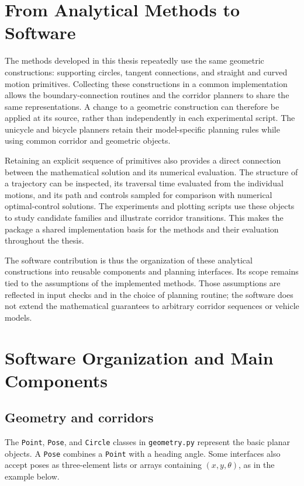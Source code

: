 \section{From Analytical Methods to Software}

The methods developed in this thesis repeatedly use the same geometric
constructions: supporting circles, tangent connections, and straight and curved
motion primitives. Collecting these constructions in a common implementation
allows the boundary-connection routines and the corridor planners to share the
same representations. A change to a geometric construction can therefore be
applied at its source, rather than independently in each experimental script.
The unicycle and bicycle planners retain their model-specific planning rules
while using common corridor and geometric objects.

Retaining an explicit sequence of primitives also provides a direct connection
between the mathematical solution and its numerical evaluation. The structure
of a trajectory can be inspected, its traversal time evaluated from the
individual motions, and its path and controls sampled for comparison with
numerical optimal-control solutions. The experiments and plotting scripts use
these objects to study candidate families and illustrate corridor transitions.
This makes the package a shared implementation basis for the methods and their
evaluation throughout the thesis.

The software contribution is thus the organization of these analytical
constructions into reusable components and planning interfaces. Its scope
remains tied to the assumptions of the implemented methods. Those assumptions
are reflected in input checks and in the choice of planning routine; the
software does not extend the mathematical guarantees to arbitrary corridor
sequences or vehicle models.

\section{Software Organization and Main Components}
\label{sec:kappa-classes}

\subsection{Geometry and corridors}

The \texttt{Point}, \texttt{Pose}, and \texttt{Circle} classes in
\texttt{geometry.py} represent the basic planar objects. A \texttt{Pose}
combines a \texttt{Point} with a heading angle. Some interfaces also accept
poses as three-element lists or arrays containing $(x,y,\theta)$, as in the
example below.

